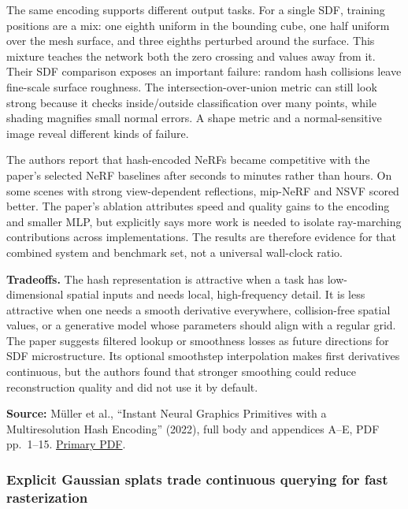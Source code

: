 The same encoding supports different output tasks. For a single SDF, training positions are a mix: one eighth uniform in the bounding cube, one half uniform over the mesh surface, and three eighths perturbed around the surface. This mixture teaches the network both the zero crossing and values away from it. Their SDF comparison exposes an important failure: random hash collisions leave fine-scale surface roughness. The intersection-over-union metric can still look strong because it checks inside/outside classification over many points, while shading magnifies small normal errors. A shape metric and a normal-sensitive image reveal different kinds of failure.

The authors report that hash-encoded NeRFs became competitive with the paper's selected NeRF baselines after seconds to minutes rather than hours. On some scenes with strong view-dependent reflections, mip-NeRF and NSVF scored better. The paper's ablation attributes speed and quality gains to the encoding and smaller MLP, but explicitly says more work is needed to isolate ray-marching contributions across implementations. The results are therefore evidence for that combined system and benchmark set, not a universal wall-clock ratio.

\textbf{Tradeoffs.} The hash representation is attractive when a task has low-dimensional spatial inputs and needs local, high-frequency detail. It is less attractive when one needs a smooth derivative everywhere, collision-free spatial values, or a generative model whose parameters should align with a regular grid. The paper suggests filtered lookup or smoothness losses as future directions for SDF microstructure. Its optional smoothstep interpolation makes first derivatives continuous, but the authors found that stronger smoothing could reduce reconstruction quality and did not use it by default.

\textbf{Source:} Müller et al., ``Instant Neural Graphics Primitives with a Multiresolution Hash Encoding'' (2022), full body and appendices A--E, PDF pp.~1--15. \href{https://nvlabs.github.io/instant-ngp/assets/mueller2022instant.pdf}{Primary PDF}.

\subsubsection{Explicit Gaussian splats trade continuous querying for fast rasterization}\label{04-visual-computing-ii-ch034-explicit-gaussian-splats-trade-continuous-querying-for-fast-rasterization}

